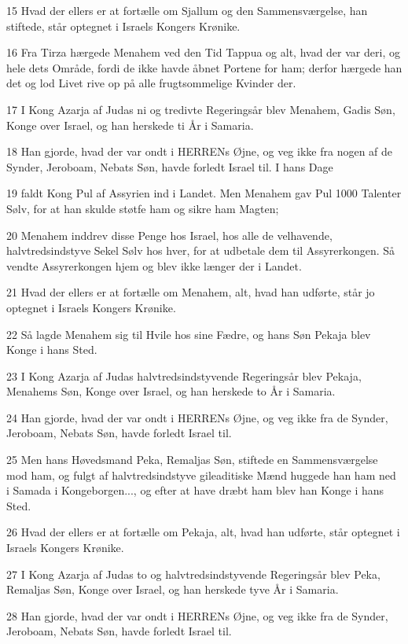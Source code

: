 \par 15 Hvad der ellers er at fortælle om Sjallum og den Sammensværgelse, han stiftede, står optegnet i Israels Kongers Krønike.
\par 16 Fra Tirza hærgede Menahem ved den Tid Tappua og alt, hvad der var deri, og hele dets Område, fordi de ikke havde åbnet Portene for ham; derfor hærgede han det og lod Livet rive op på alle frugtsommelige Kvinder der.
\par 17 I Kong Azarja af Judas ni og tredivte Regeringsår blev Menahem, Gadis Søn, Konge over Israel, og han herskede ti År i Samaria.
\par 18 Han gjorde, hvad der var ondt i HERRENs Øjne, og veg ikke fra nogen af de Synder, Jeroboam, Nebats Søn, havde forledt Israel til. I hans Dage
\par 19 faldt Kong Pul af Assyrien ind i Landet. Men Menahem gav Pul 1000 Talenter Sølv, for at han skulde støtfe ham og sikre ham Magten;
\par 20 Menahem inddrev disse Penge hos Israel, hos alle de velhavende, halvtredsindstyve Sekel Sølv hos hver, for at udbetale dem til Assyrerkongen. Så vendte Assyrerkongen hjem og blev ikke længer der i Landet.
\par 21 Hvad der ellers er at fortælle om Menahem, alt, hvad han udførte, står jo optegnet i Israels Kongers Krønike.
\par 22 Så lagde Menahem sig til Hvile hos sine Fædre, og hans Søn Pekaja blev Konge i hans Sted.
\par 23 I Kong Azarja af Judas halvtredsindstyvende Regeringsår blev Pekaja, Menahems Søn, Konge over Israel, og han herskede to År i Samaria.
\par 24 Han gjorde, hvad der var ondt i HERRENs Øjne, og veg ikke fra de Synder, Jeroboam, Nebats Søn, havde forledt Israel til.
\par 25 Men hans Høvedsmand Peka, Remaljas Søn, stiftede en Sammensværgelse mod ham, og fulgt af halvtredsindstyve gileaditiske Mænd huggede han ham ned i Samada i Kongeborgen..., og efter at have dræbt ham blev han Konge i hans Sted.
\par 26 Hvad der ellers er at fortælle om Pekaja, alt, hvad han udførte, står optegnet i Israels Kongers Krønike.
\par 27 I Kong Azarja af Judas to og halvtredsindstyvende Regeringsår blev Peka, Remaljas Søn, Konge over Israel, og han herskede tyve År i Samaria.
\par 28 Han gjorde, hvad der var ondt i HERRENs Øjne, og veg ikke fra de Synder, Jeroboam, Nebats Søn, havde forledt Israel til.
